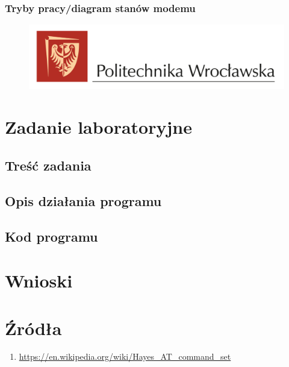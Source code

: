 \documentclass{article}
\begin{document}
            \subsubsection{Tryby pracy/diagram stanów modemu}
        \begin{figure}[ht]
            \centering
            \includegraphics[width=\textwidth]{images/logo_PWr_kolor_poziom.png}
            \caption{}
            \label{fig:tex2}
        \end{figure}
        \FloatBarrier
    \section{Zadanie laboratoryjne}
        \subsection{Treść zadania}
        \subsection{Opis działania programu}
        \subsection{Kod programu}
    \section{Wnioski}
    \section{Źródła}
        \begin{enumerate}[label=\arabic*.]
            \item \url{https://en.wikipedia.org/wiki/Hayes_AT_command_set}
        \end{enumerate}
\end{document}
